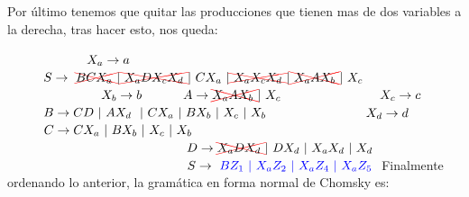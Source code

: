 Por último tenemos que quitar las producciones que tienen mas de dos variables a la derecha, tras hacer esto, nos queda:\vspace{0.5em} \newline

$ \hspace*{2.2cm}X_a\rightarrow a $        $ \hspace*{1cm}S\rightarrow \  \Rcancel{BCX_a\ }   |\Rcancel{\ X_aDX_cX_d \ } |\ CX_a\  |\Rcancel{\ X_aX_cX_d\ } |\Rcancel{\ X_aAX_b\ } |\ X_c $\newline
$ \hspace*{2.6cm}X_b\rightarrow b $        $ \hspace*{1cm}A\rightarrow \Rcancel{X_aAX_b\ } |\ X_c $\newline
$ \hspace*{2.6cm}X_c\rightarrow c  $        $ \hspace*{1cm}B\rightarrow CD\  |\  AX_d  \ \  |\ CX_a\  |\ BX_b\  |\ X_c\  |\ X_b $\newline
$ \hspace*{2.6cm}X_d\rightarrow d $        $ \hspace*{1cm}C\rightarrow CX_a\  |\  BX_b \ |\ X_c \  |\ X_b $\newline
                                                                              $ \hspace*{5cm}D\rightarrow \Rcancel{X_aDX_d\ }|\ DX_d\ |\ X_aX_d\  |\ X_d $\newline
                                                                              $ \hspace*{5cm}S\rightarrow \ \Blue{ BZ_1\   |\ X_aZ_2\   |\ X_aZ_4\  |\ X_aZ_5\  }$\newline
\newpage                                                                      
Finalmente ordenando lo anterior, la gramática en forma normal de Chomsky es:\vspace{0.5em} \newline

